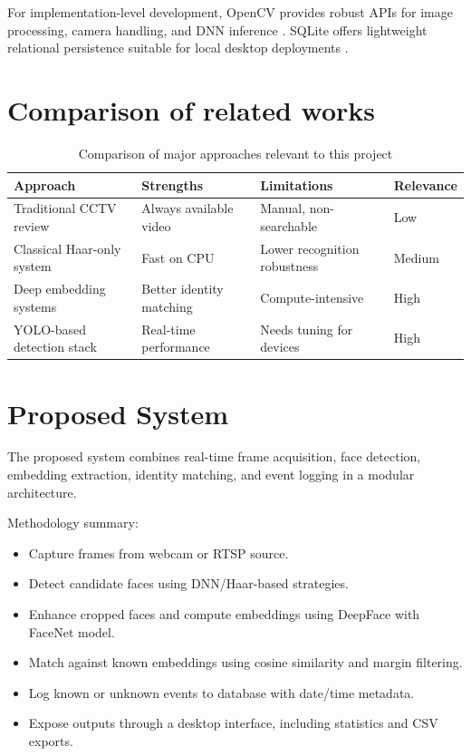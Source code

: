\documentclass{fisatprojectfinal}
\begin{document}
For implementation-level development, OpenCV provides robust APIs for image processing, camera handling, and DNN inference \cite{opencv_library}. SQLite offers lightweight relational persistence suitable for local desktop deployments \cite{sqlite_doc}.

\section{Comparison of related works}
\begin{table}[h!]
\centering
\caption{Comparison of major approaches relevant to this project}
\begin{tabular}{|l|l|l|l|}
\hline
Approach & Strengths & Limitations & Relevance \\
\hline
Traditional CCTV review & Always available video & Manual, non-searchable & Low \\
\hline
Classical Haar-only system & Fast on CPU & Lower recognition robustness & Medium \\
\hline
Deep embedding systems & Better identity matching & Compute-intensive & High \\
\hline
YOLO-based detection stack & Real-time performance & Needs tuning for devices & High \\
\hline
\end{tabular}
\end{table}

\section{Proposed System}
The proposed system combines real-time frame acquisition, face detection, embedding extraction, identity matching, and event logging in a modular architecture.

Methodology summary:
\begin{itemize}
	\item Capture frames from webcam or RTSP source.
	\item Detect candidate faces using DNN/Haar-based strategies.
	\item Enhance cropped faces and compute embeddings using DeepFace with FaceNet model.
	\item Match against known embeddings using cosine similarity and margin filtering.
	\item Log known or unknown events to database with date/time metadata.
	\item Expose outputs through a desktop interface, including statistics and CSV exports.
\end{itemize}
\end{document}
